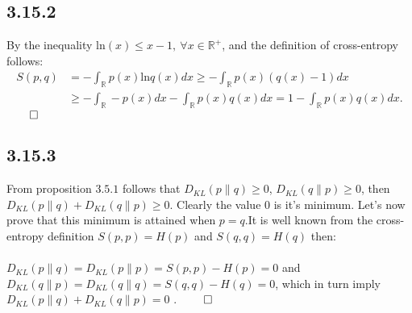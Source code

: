 \documentclass{exam}
\renewenvironment{proof}{{\noindent\itshape\ignorespaces}}{{\hfill$\qed$\\}}
\begin{document}
\subsection*{3.15.2}
By the inequality $\text{ln}(x) \leq x - 1, \ \forall x \in \mathbb{R}^{+}$, and the definition of cross-entropy follows:\\
\begin{proof}
    \begin{equation*}
        \begin{aligned}
            S(p,q) &= -\displaystyle\int_{\mathbb{R}}   p(x) \text{ln}q(x) dx \geq - \int_{\mathbb{R}} p(x)(q(x) - 1) dx \\
            &\geq -\displaystyle\int_{\mathbb{R}} - p(x) dx  -\displaystyle\int_{\mathbb{R}} p(x) q(x) dx =  1 - \displaystyle\int_{\mathbb{R}} p(x) q(x) dx.
        \end{aligned}    
    \end{equation*}
\end{proof}

\subsection*{3.15.3}
From proposition $3.5.1$ follows that $D_{KL}(p \lVert q) \geq 0$, $D_{KL}(q \lVert p ) \geq 0$, then $ D_{KL}(p \lVert q) +  D_{KL}(q \lVert p ) \geq 0$. Clearly the value 
$0$ is it's minimum. Let's now prove that this minimum is attained when $p=q$.It is well known from the cross-entropy definition $S(p,p) = H(p)$ and $S(q,q) = H(q)$ then:\\
\\
\begin{proof}
    $D_{KL}(p \lVert q) = D_{KL}(p \lVert p) = S(p,p) - H(p) = 0$ and $D_{KL}(q \lVert p) = D_{KL}(q \lVert q) = S(q,q) - H(q) = 0$, which in turn imply $D_{KL}(p \lVert q) + D_{KL}(q \lVert p) = 0 \text{ .}$
\end{proof}
\end{document}
